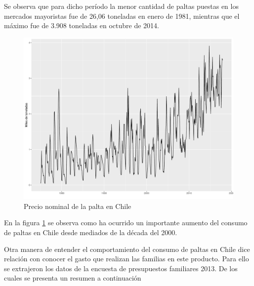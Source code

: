 Se observa que para dicho período la menor cantidad de paltas puestas en los mercados mayoristas fue de 26,06 toneladas en enero de 1981, mientras que el máximo fue de 3.908 toneladas en octubre de 2014. 

\begin{figure}
	\caption{Precio nominal de la palta en Chile}\label{fig_arribo_mayoristas}
	\includegraphics[scale = 0.4]{fig_market/arribo_mayoristas.pdf}
\end{figure}

En la figura \ref{fig_arribo_mayoristas} se observa como ha ocurrido un importante aumento del consumo de paltas en Chile desde mediados de la década del 2000.
 
Otra manera de entender el comportamiento del consumo de paltas en Chile dice relación con conocer el gasto que realizan las familias en este producto. Para ello se extrajeron los datos de la encuesta de presupuestos familiares 2013. De los cuales se presenta un resumen a continuación 

